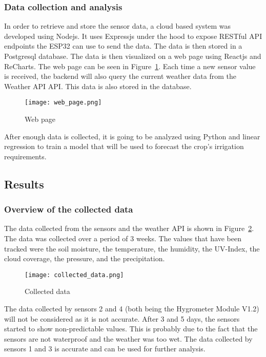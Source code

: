 \documentclass[11pt]{scrartcl} %
\begin{document}
\subsubsection{Data collection and analysis}
\label{sec:data_collection}
In order to retrieve and store the sensor data, a cloud based system was developed using \gls{Nodejs}. It uses \gls{Expressjs} under the hood to expose RESTful API endpoints the ESP32 can use to send the data. The data is then stored in a \gls{Postgresql} database. The data is then visualized on a web page using \gls{Reactjs} and \gls{ReCharts}. The web page can be seen in Figure~\ref{fig:web_page}.
Each time a new sensor value is received, the backend will also query the current weather data from the \gls{Weather API} API. This data is also stored in the database.
\begin{figure}[H]
	\centering
	\texttt{[image: web\_page.png]}
	\caption{Web page}
	\label{fig:web_page}
\end{figure}
After enough data is collected, it is going to be analyzed using \gls{Python} and linear regression to train a model that will be used to forecast the crop's irrigation requirements.

\subsection{Results}
\subsubsection{Overview of the collected data}
The data collected from the sensors and the weather API is shown in Figure~\ref{fig:collected_data}. The data was collected over a period of 3 weeks. The values that have been tracked were the soil moisture, the temperature, the humidity, the UV-Index, the cloud coverage, the pressure, and the precipitation.
\begin{figure}[H]
	\centering
	\texttt{[image: collected\_data.png]}
	\caption{Collected data}
	\label{fig:collected_data}
\end{figure}
The data collected by sensors 2 and 4 (both being the Hygrometer Module V1.2) will not be considered as it is not accurate. After 3 and 5 days, the sensors started to show non-predictable values. This is probably due to the fact that the sensors are not waterproof and the weather was too wet. The data collected by sensors 1 and 3 is accurate and can be used for further analysis.
\end{document}
